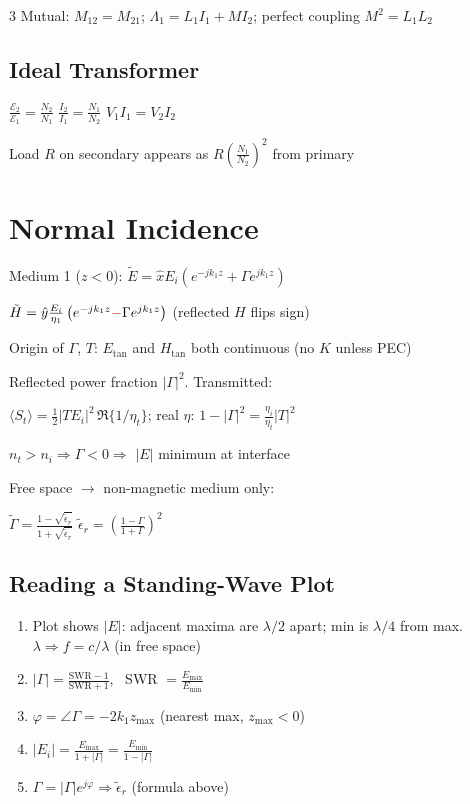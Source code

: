\documentclass[11pt]{article}
\newcommand{\warn}[1]{\textcolor{red!70!black}{#1}}
\begin{document}
\begin{multicols*}{3}
Mutual: $M_{12}=M_{21}$; $\Lambda_1=L_1I_1+MI_2$; perfect coupling $M^2=L_1L_2$

\subsection*{Ideal Transformer}

$\frac{\mathcal E_2}{\mathcal E_1}=\frac{N_2}{N_1}$ \quad $\frac{I_2}{I_1}=\frac{N_1}{N_2}$ \quad $V_1I_1=V_2I_2$

Load $R$ on secondary appears as $R\left(\frac{N_1}{N_2}\right)^2$ from primary


\columnbreak
\section*{Normal Incidence}

Medium 1 ($z<0$): $\tilde E=\hat xE_i\left(e^{-jk_1z}+\Gamma e^{jk_1z}\right)$

$\tilde H=\hat y\frac{E_i}{\eta_1}\left(e^{-jk_1z}\warn{-}\Gamma e^{jk_1z}\right)$ (reflected $H$ flips sign)

Origin of $\Gamma$, $T$: $E_\text{tan}$ and $H_\text{tan}$ both continuous (no $K$ unless PEC)

Reflected power fraction $|\Gamma|^2$. Transmitted:

$\langle S_t\rangle=\frac12|TE_i|^2\,\Re\{1/\eta_t\}$; real $\eta$: $1-|\Gamma|^2=\frac{\eta_i}{\eta_t}|T|^2$

$n_t>n_i\Rightarrow\Gamma<0\Rightarrow$ $|E|$ minimum at interface

Free space $\to$ non-magnetic medium only:

$\tilde \Gamma=\frac{1-\sqrt{\tilde\epsilon_r}}{1+\sqrt{\tilde\epsilon_r}}$ \hfill $\tilde\epsilon_r=\left(\frac{1-\Gamma}{1+\Gamma}\right)^2$

\subsection*{Reading a Standing-Wave Plot}

\begin{enumerate}[leftmargin=1.3em]
  \item \warn{Plot shows $|E|$}: adjacent maxima are $\lambda/2$ apart; min is $\lambda/4$ from max. $\lambda\Rightarrow f=c/\lambda$ (in free space)
  \item $|\Gamma|=\frac{\text{SWR}-1}{\text{SWR}+1}$, \ SWR $=\frac{E_\text{max}}{E_\text{min}}$
  \item $\varphi=\angle\Gamma=-2k_1z_\text{max}$ (nearest max, $z_\text{max}<0$)
  \item $|E_i|=\frac{E_\text{max}}{1+|\Gamma|}=\frac{E_\text{min}}{1-|\Gamma|}$
  \item $\Gamma=|\Gamma|e^{j\varphi}\Rightarrow\tilde\epsilon_r$ (formula above)
\end{enumerate}


\end{multicols*}
\end{document}
